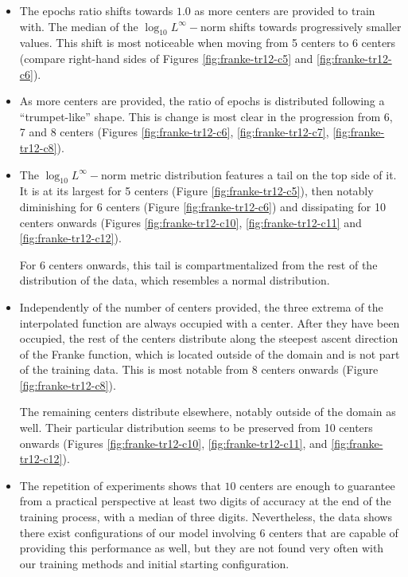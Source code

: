 \documentclass[12pt]{report} %
\begin{document}
\begin{itemize}
  \item The epochs ratio shifts towards $1.0$ as more centers are 
  provided to train with. The median of the $\log_{10}L^\infty-$norm 
  shifts towards progressively smaller values. This shift is most noticeable when
  moving from 5 centers to 6 centers (compare right-hand sides of Figures 
  \ref{fig:franke-tr12-c5} and \ref{fig:franke-tr12-c6}).
  \item As more centers are provided, the ratio of epochs is distributed 
  following a ``trumpet-like'' shape. This is change is most clear in the progression
  from 6, 7 and 8 centers (Figures \ref{fig:franke-tr12-c6}, \ref{fig:franke-tr12-c7},
  \ref{fig:franke-tr12-c8}).
  \item The $\log_{10}L^\infty-$norm metric distribution features a tail on the top
  side of it. It is at its largest for 5 centers (Figure \ref{fig:franke-tr12-c5}),
  then notably diminishing for 6 centers (Figure \ref{fig:franke-tr12-c6})
  and dissipating for 10 centers onwards (Figures \ref{fig:franke-tr12-c10}, 
  \ref{fig:franke-tr12-c11} and \ref{fig:franke-tr12-c12}).
  
  For 6 centers onwards, this tail is compartmentalized from the rest of the 
  distribution of the data, which resembles a normal distribution.

  \item Independently of the number of centers provided, the three extrema of the
  interpolated function are always occupied with a center. After they have been
  occupied, the rest of the centers distribute along the steepest ascent direction
  of the Franke function, which is located outside of the domain and is not part of
  the training data. This is
  most notable from 8 centers onwards (Figure \ref{fig:franke-tr12-c8}).

  The remaining centers distribute elsewhere, notably outside of the domain 
  as well. Their particular distribution seems to be preserved from 10 centers
  onwards (Figures 
  \ref{fig:franke-tr12-c10}, \ref{fig:franke-tr12-c11}, and
  \ref{fig:franke-tr12-c12}).

  \item The repetition of experiments shows that $10$ centers are enough to guarantee
  from a practical perspective at least two digits of accuracy at the end of the
  training process, with a median of three digits. Nevertheless, the data shows 
  there exist configurations of our model involving 6 centers that are capable of
  providing this performance as well, but they are not found very often with our
  training methods and initial starting configuration.
\end{itemize}
\end{document}
